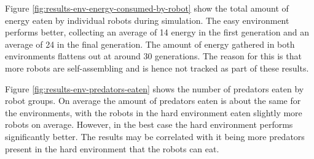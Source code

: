 
Figure \ref{fig:results-env-energy-consumed-by-robot} show the total amount of energy eaten by individual robots during simulation.
The easy environment performs better, collecting an average of 14 energy in the first generation and an average of 24 in the final generation.
The amount of energy gathered in both environments flattens out at around 30 generations.
The reason for this is that more robots are self-assembling and is hence not tracked as part of these results.

\vspace*{\fill}
\newpage
\vspace*{\fill}


Figure \ref{fig:results-env-predators-eaten} shows the number of predators eaten by robot groups.
On average the amount of predators eaten is about the same for the environments, with the robots in the hard environment eaten slightly more robots on average.
However, in the best case the hard environment performs significantly better. 
The results may be correlated with it being more predators present in the hard environment that the robots can eat.
\vspace*{\fill}
